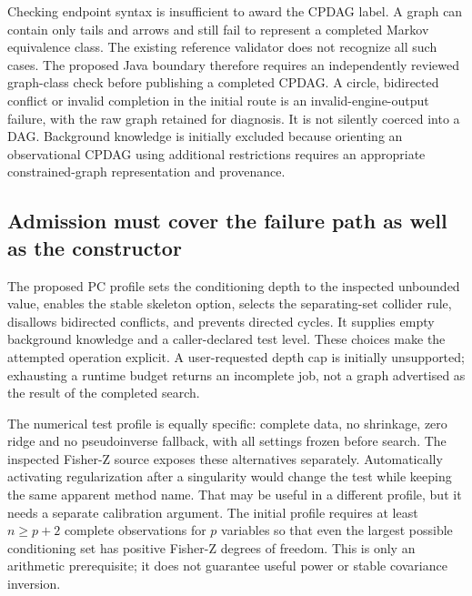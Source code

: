 Checking endpoint syntax is insufficient to award the CPDAG label. A
graph can contain only tails and arrows and still fail to represent a
completed Markov equivalence class. The existing reference validator
does not recognize all such cases. The proposed Java boundary therefore
requires an independently reviewed graph-class check before publishing a
completed CPDAG. A circle, bidirected conflict or invalid completion in
the initial route is an invalid-engine-output failure, with the raw
graph retained for diagnosis. It is not silently coerced into a DAG.
Background knowledge is initially excluded because orienting an
observational CPDAG using additional restrictions requires an
appropriate constrained-graph representation and provenance.
\citep{exec13_java_adapter_contract}

\hypertarget{admission-must-cover-the-failure-path-as-well-as-the-constructor}{%
\subsection{Admission must cover the failure path as well as the
constructor}\label{admission-must-cover-the-failure-path-as-well-as-the-constructor}}

The proposed PC profile sets the conditioning depth to the inspected
unbounded value, enables the stable skeleton option, selects the
separating-set collider rule, disallows bidirected conflicts, and
prevents directed cycles. It supplies empty background knowledge and a
caller-declared test level. These choices make the attempted operation
explicit. A user-requested depth cap is initially unsupported;
exhausting a runtime budget returns an incomplete job, not a graph
advertised as the result of the completed search.
\citep{exec13_java_adapter_contract,exec13_java_adapter_source}

The numerical test profile is equally specific: complete data, no
shrinkage, zero ridge and no pseudoinverse fallback, with all settings
frozen before search. The inspected Fisher-Z source exposes these
alternatives separately. Automatically activating regularization after a
singularity would change the test while keeping the same apparent method
name. That may be useful in a different profile, but it needs a separate
calibration argument. The initial profile requires at least
\(n\geq p+2\) complete observations for \(p\) variables so that even the
largest possible conditioning set has positive Fisher-Z degrees of
freedom. This is only an arithmetic prerequisite; it does not guarantee
useful power or stable covariance inversion.
\citep{exec13_java_adapter_contract,exec13_java_adapter_source}

